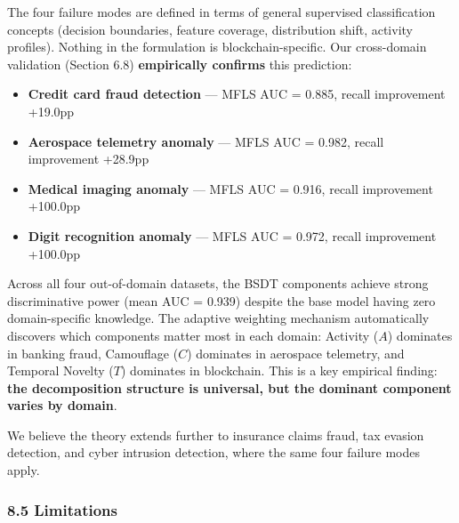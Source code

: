 \documentclass[
  11pt,
]{article}
\providecommand{\tightlist}{%
  \setlength{\itemsep}{0pt}\setlength{\parskip}{0pt}}
\begin{document}
The four failure modes are defined in terms of general supervised
classification concepts (decision boundaries, feature coverage,
distribution shift, activity profiles). Nothing in the formulation is
blockchain-specific. Our cross-domain validation (Section 6.8)
\textbf{empirically confirms} this prediction:

\begin{itemize}
\tightlist
\item
  \textbf{Credit card fraud detection} — MFLS AUC = 0.885, recall
  improvement +19.0pp
\item
  \textbf{Aerospace telemetry anomaly} — MFLS AUC = 0.982, recall
  improvement +28.9pp
\item
  \textbf{Medical imaging anomaly} — MFLS AUC = 0.916, recall
  improvement +100.0pp
\item
  \textbf{Digit recognition anomaly} — MFLS AUC = 0.972, recall
  improvement +100.0pp
\end{itemize}

Across all four out-of-domain datasets, the BSDT components achieve
strong discriminative power (mean AUC = 0.939) despite the base model
having zero domain-specific knowledge. The adaptive weighting mechanism
automatically discovers which components matter most in each domain:
Activity (\(A\)) dominates in banking fraud, Camouflage (\(C\))
dominates in aerospace telemetry, and Temporal Novelty (\(T\)) dominates
in blockchain. This is a key empirical finding: \textbf{the
decomposition structure is universal, but the dominant component varies
by domain}.

We believe the theory extends further to insurance claims fraud, tax
evasion detection, and cyber intrusion detection, where the same four
failure modes apply.

\subsubsection{8.5 Limitations}\label{limitations}
\end{document}
